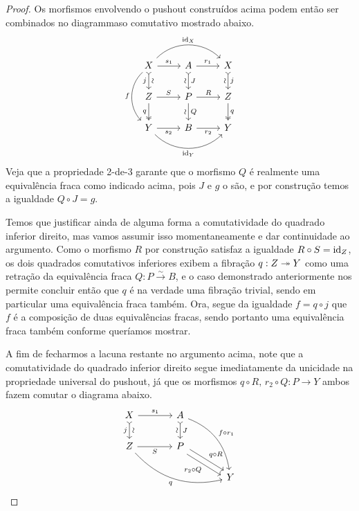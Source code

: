 \begin{proof}
  Os morfismos envolvendo o pushout construídos acima podem então ser combinados no diagrammaso comutativo mostrado abaixo.
  \begin{displaymath}
    \begin{tikzcd}
      X
      \arrow[r, "s_{1}"]
      \arrow[d, tail, "j" {swap}, "\sim" {sloped}]
      \arrow[rr, bend left=45, "\id_{X}"]
      \arrow[dd, bend right=45, "f" swap]
      & A
      \arrow[d, tail, "J", "\sim" {swap,sloped}]
      \arrow[r, "r_{1}"]
      & X
      \arrow[d, tail, "j", "\sim" {swap,sloped}]
      \\ Z
      \arrow[r, "S"]
      \arrow[d, two heads, "q" swap]
      & P
      \arrow[d, "Q", "\sim" {swap,sloped}]
      \arrow[r, "R"]
      & Z
      \arrow[d, two heads, "q"]
      \\ Y
      \arrow[r, "s_{2}" swap]
      \arrow[rr, bend right=45, "\id_{Y}" swap]
      & B
      \arrow[r, "r_{2}" swap]
      & Y
    \end{tikzcd}
  \end{displaymath}
  Veja que a propriedade 2-de-3 garante que o morfismo $Q$ é realmente uma equivalência fraca como indicado acima, pois $J$ e $g$ o são, e por construção temos a igualdade $Q \circ J = g$.

  Temos que justificar ainda de alguma forma a comutatividade do quadrado inferior direito, mas vamos assumir isso momentaneamente e dar continuidade ao argumento.
  Como o morfismo $R$ por construção satisfaz a igualdade $R \circ S = \mathrm{id}_{Z}$, os dois quadrados comutativos inferiores exibem a fibração $q: Z \twoheadrightarrow Y$ como uma retração da equivalência fraca $Q: P \overset{\sim}{\to} B$, e o caso demonstrado anteriormente nos permite concluir então que $q$ é na verdade uma fibração trivial, sendo em particular uma equivalência fraca também.
  Ora, segue da igualdade $f = q \circ j$ que $f$ é a composição de duas equivalências fracas, sendo portanto uma equivalência fraca também conforme queríamos mostrar.

  A fim de fecharmos a lacuna restante no argumento acima, note que a comutatividade do quadrado inferior direito segue imediatamente da unicidade na propriedade universal do pushout, já que os morfismos $q \circ R,\, r_{2} \circ Q: P \to Y$ ambos fazem comutar o diagrama abaixo.
  \begin{displaymath}
    \begin{tikzcd}[column sep=1.25cm]
       X
      \arrow[r, "s_{1}"]
      \arrow[d, tail, "j" {swap}, "\sim" {sloped}]
      & A
      \arrow[d, tail , "J", "\sim" {swap,sloped}]
      \arrow[rdd, bend left=30, "f \circ r_{1}"]
      \\ Z
      \arrow[r, "S" swap]
      \arrow[rrd, bend right=30, "q" swap]
      & P
      \arrow[rd, shift left=1.2, "q \circ R"]
      \arrow[rd, shift right=1.2, "r_{2} \circ Q" swap]
      \\ & & Y
    \end{tikzcd} \qedhere
  \end{displaymath}
\end{proof}

